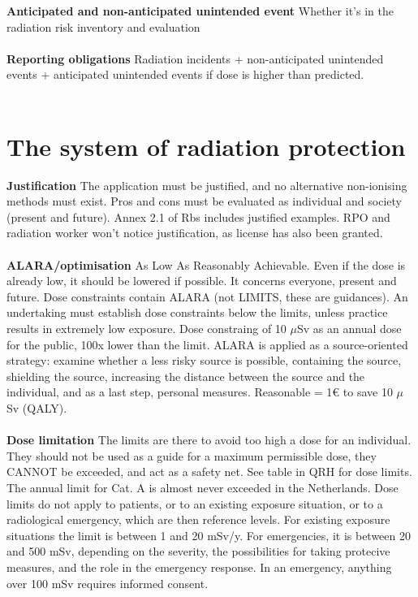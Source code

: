 \textbf{Anticipated and non-anticipated unintended event} Whether it's in the radiation risk inventory and evaluation \\\\
\textbf{Reporting obligations} Radiation incidents + non-anticipated unintended events + anticipated unintended events if dose is higher than predicted.\\\\
\section{The system of radiation protection}
\textbf{Justification} The application must be justified, and no alternative non-ionising methods must exist. Pros and cons must be evaluated as individual and society (present and future). Annex 2.1 of Rbs includes justified examples. RPO and radiation worker won't notice justification, as license has also been granted.\\\\
\textbf{ALARA/optimisation}  As Low As Reasonably Achievable. Even if the dose is already low, it should be lowered if possible. It concerns everyone, present and future. Dose constraints contain ALARA (not LIMITS, these are guidances). An undertaking must establish dose constraints below the limits, unless practice results in extremely low exposure. Dose constraing of 10 $\mu$Sv as an annual dose for the public, 100x lower than the limit. ALARA is applied as a source-oriented strategy: examine whether a less risky source is possible, containing the source, shielding the source, increasing the distance between the source and the individual, and as a last step, personal measures. Reasonable = 1€ to save 10 $\mu$Sv (QALY). \\\\
\textbf{Dose limitation}  The limits are there to avoid too high a dose for an individual. They should not be used as a guide for a maximum permissible dose, they CANNOT be exceeded, and act as a safety net. See table in QRH for dose limits. The annual limit for Cat. A is almost never exceeded in the Netherlands. Dose limits do not apply to patients, or to an existing exposure situation, or to a radiological emergency, which are then reference levels. For existing exposure situations the limit is between 1 and 20 mSv/y. For emergencies, it is between 20 and 500 mSv, depending on the severity, the possibilities for taking protecive measures, and the role in the emergency response. In an emergency, anything over 100 mSv requires informed consent.\\\\
